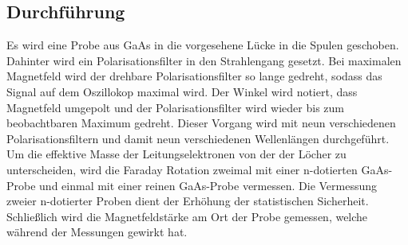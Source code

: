 \subsection{Durchführung}
Es wird eine Probe aus GaAs in die vorgesehene Lücke in die Spulen geschoben. 
Dahinter wird ein Polarisationsfilter in den Strahlengang gesetzt.
Bei maximalen Magnetfeld wird der drehbare Polarisationsfilter so lange gedreht, sodass das Signal auf dem Oszillokop maximal wird.
Der Winkel wird notiert, dass Magnetfeld umgepolt und der Polarisationsfilter wird wieder bis zum beobachtbaren Maximum gedreht.
Dieser Vorgang wird mit neun verschiedenen Polarisationsfiltern und damit neun verschiedenen Wellenlängen durchgeführt.
Um die effektive Masse der Leitungselektronen von der der Löcher zu unterscheiden, wird die Faraday Rotation zweimal mit einer n-dotierten GaAs-Probe und einmal mit einer reinen GaAs-Probe vermessen.
Die Vermessung zweier n-dotierter Proben dient der Erhöhung der statistischen Sicherheit.
Schließlich wird die Magnetfeldstärke am Ort der Probe gemessen, welche während der Messungen gewirkt hat.
